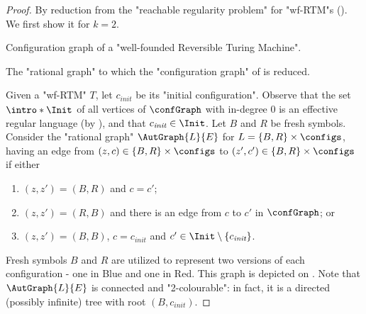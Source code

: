 \begin{proof}%
    By reduction from the "reachable regularity problem" for "wf-RTM"s
    (). We first show it for $k=2$.
    \begin{marginfigure}%
        \centering
        \begin{tikzpicture}
            
        \end{tikzpicture}
        \caption{
            \AP\label{fig:reduction-wf-RTM-to-colouring-config-graph-wf-RTM}
            Configuration graph of a "well-founded Reversible Turing Machine".
        }
    \end{marginfigure}%
    \begin{marginfigure}%
        \centering
        \begin{tikzpicture}
            
        \end{tikzpicture}
        \caption{
            \AP\label{subfig:reduction-wf-RTM-to-colouring}
            The "rational graph" to which the "configuration graph"
            of  is reduced.
        }
    \end{marginfigure}%
    \AP Given a "wf-RTM" $T$, let $c_{\textit{init}}$ be its "initial configuration".
    Observe that the set $\intro*\Init$ of all vertices of $\confGraph$ with in-degree $0$ is an effective regular language (by ), and that $c_{\textit{init}} \in \Init$. Let $B$ and $R$ be fresh symbols. 
    Consider the "rational graph" $\AutGraph{L}{E}$ for $L = \set{B,R} \times \configs$, having 
    an edge from $(z,c) \in \{B,R\} \times \configs$ to $(z',c') \in \{B,R\} \times \configs$ if either 
    \begin{enumerate}
        \item $(z,z') = (B,R)$ and $c=c'$;
        \item $(z,z') = (R,B)$ and there is an edge from $c$ to $c'$ in $\confGraph$; or
        \item $(z,z') = (B,B)$, $c = c_{\textit{init}}$ and $c' \in \Init \setminus \set{c_{\textit{init}}}$.
    \end{enumerate}
Fresh symbols $B$ and $R$ are utilized to represent two versions of each configuration - one in Blue and one in Red. This graph is depicted
    on .
    Note that $\AutGraph{L}{E}$ is connected and "2-colourable": in fact, it is a directed (possibly infinite) tree with root $(B,c_{\textit{init}})$. 
    

\end{proof}
